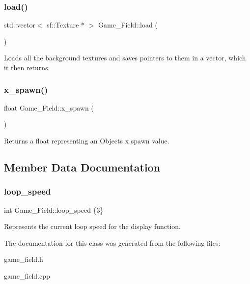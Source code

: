 \subsubsection{\texorpdfstring{load()}{load()}}
{\footnotesize\ttfamily std\+::vector$<$ sf\+::\+Texture $\ast$ $>$ Game\+\_\+\+Field\+::load (\begin{DoxyParamCaption}{ }\end{DoxyParamCaption})}

Loads all the background textures and saves pointers to them in a vector, which it then returns. \mbox{\label{classGame__Field_a6ccee168fe4ca574f3b9de452cecc38c}} 
\subsubsection{\texorpdfstring{x\+\_\+spawn()}{x\_spawn()}}
{\footnotesize\ttfamily float Game\+\_\+\+Field\+::x\+\_\+spawn (\begin{DoxyParamCaption}{ }\end{DoxyParamCaption})}

Returns a float representing an Objects x spawn value. 

\subsection{Member Data Documentation}
\mbox{\label{classGame__Field_a3d3cda2cf3a0eae2229f5b4a6e0ae532}} 
\subsubsection{\texorpdfstring{loop\+\_\+speed}{loop\_speed}}
{\footnotesize\ttfamily int Game\+\_\+\+Field\+::loop\+\_\+speed \{3\}}

Represents the current loop speed for the display function. 

The documentation for this class was generated from the following files\+:\begin{DoxyCompactItemize}
\item 
game\+\_\+field.\+h\item 
game\+\_\+field.\+cpp\end{DoxyCompactItemize}
